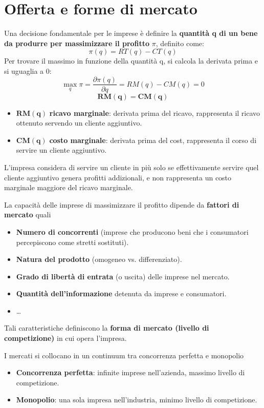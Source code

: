\documentclass[../main.tex]{subfiles}
\begin{document}
\section{Offerta e forme di mercato}

Una decisione fondamentale per le imprese è definire la \textbf{quantità q di un bene da produrre per massimizzare il profitto} $\pi$, definito come:
$$\pi(q) = RT(q) - CT(q)$$
Per trovare il massimo in funzione della quantità q, si calcola la derivata prima e si uguaglia a 0:
$$\max_q \pi = \frac{\partial \pi(q)}{\partial q}=RM(q) - CM(q) = 0$$
$$\mathbf{RM(q) = CM(q)}$$
\begin{itemize}
\item $\mathbf{RM(q)}$ \textbf{ricavo marginale}: derivata prima del ricavo, rappresenta il ricavo ottenuto servendo un cliente aggiuntivo.
\item $\mathbf{CM(q)}$ \textbf{costo marginale}: derivata prima del cost, rappresenta il corso di servire un cliente aggiuntivo.
\end{itemize}

L'impresa considera di servire un cliente in più solo se effettivamente servire quel cliente aggiuntivo genera profitti addizionali, e non rappresenta un costo marginale maggiore del ricavo marginale.

La capacità delle imprese di massimizzare il profitto dipende da \textbf{fattori di mercato} quali
\begin{itemize}
    \item \textbf{Numero di concorrenti} (imprese che producono beni che i consumatori percepiscono come stretti sostituti).
    \item \textbf{Natura del prodotto} (omogeneo vs. differenziato).
    \item \textbf{Grado di libertà di entrata} (o uscita) delle imprese nel mercato.
    \item \textbf{Quantità dell'informazione} detenuta da imprese e consumatori.
    \item \dots
\end{itemize}

Tali caratteristiche definiscono la \textbf{forma di mercato (livello di competizione)} in cui opera l'impresa.

I mercati si collocano in un continuum tra concorrenza perfetta e monopolio
\begin{itemize}
    \item \textbf{Concorrenza perfetta}: infinite imprese nell'azienda, massimo livello di competizione.
    \item \textbf{Monopolio}: una sola impresa nell'industria, minimo livello di competizione.
\end{itemize}
\end{document}
